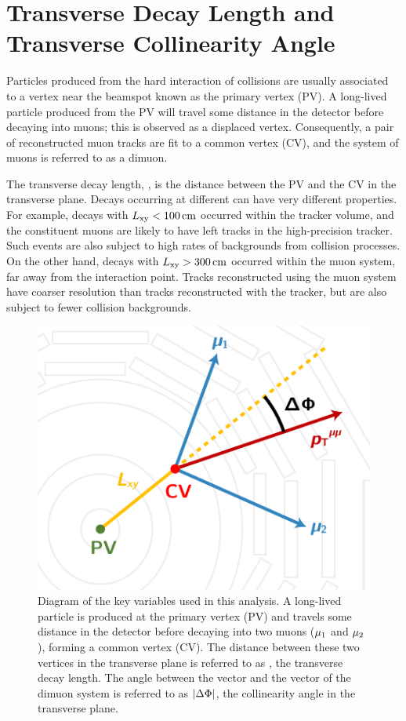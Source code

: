 \section{Transverse Decay Length and Transverse Collinearity Angle}
\label{sec:dd:keyvars}
Particles produced from the hard interaction of \pp collisions are usually associated to a vertex near the beamspot known as the primary vertex (PV).
A long-lived particle produced from the PV will travel some distance in the detector before decaying into muons; this is observed as a displaced vertex.
Consequently, a pair of reconstructed muon tracks are fit to a common vertex (CV), and the system of muons is referred to as a dimuon.

The transverse decay length, \Lxy, is the distance between the PV and the CV in the transverse plane.
Decays occurring at different \Lxy can have very different properties.
For example, decays with $L_{\mathrm{xy}} < 100\,\text{cm}$ occurred within the tracker volume, and the constituent muons are likely to have left tracks in the high-precision tracker.
Such events are also subject to high rates of backgrounds from \pp collision processes.
On the other hand, decays with $L_{\mathrm{xy}} > 300\,\text{cm}$ occurred within the muon system, far away from the interaction point.
Tracks reconstructed using the muon system have coarser resolution than tracks reconstructed with the tracker, but are also subject to fewer \pp collision backgrounds.

\begin{figure}[htpb]
  \centering
  \includegraphics[width=.7\textwidth]{figures/displaced/LxyDef.pdf}
  \caption{Diagram of the key variables used in this analysis. A long-lived particle is produced at the primary vertex (PV) and travels some distance in the detector before decaying into two muons ($\mathrm{\mu}_1$ and $\mathrm{\mu}_2$), forming a common vertex (CV). The distance between these two vertices in the transverse plane is referred to as \Lxy, the transverse decay length. The angle between the \Lxy vector and the \pT vector of the dimuon system is referred to as $|\Delta\Phi|$, the collinearity angle in the transverse plane.}
  \label{fig:dd:keyvars}
\end{figure}

